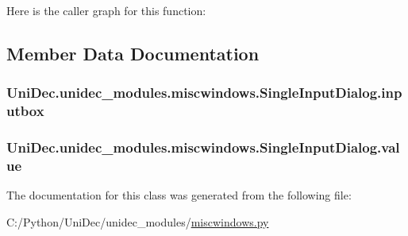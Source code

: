 Here is the caller graph for this function\+:




\subsection{Member Data Documentation}
\hypertarget{class_uni_dec_1_1unidec__modules_1_1miscwindows_1_1_single_input_dialog_a8107fecdad52394036b5a35c7a7ba18e}{}
\subsubsection[{inputbox}]{\setlength{\rightskip}{0pt plus 5cm}Uni\+Dec.\+unidec\+\_\+modules.\+miscwindows.\+Single\+Input\+Dialog.\+inputbox}\label{class_uni_dec_1_1unidec__modules_1_1miscwindows_1_1_single_input_dialog_a8107fecdad52394036b5a35c7a7ba18e}
\hypertarget{class_uni_dec_1_1unidec__modules_1_1miscwindows_1_1_single_input_dialog_ac1f7ab7d4e2275b67387e0a83d02694a}{}
\subsubsection[{value}]{\setlength{\rightskip}{0pt plus 5cm}Uni\+Dec.\+unidec\+\_\+modules.\+miscwindows.\+Single\+Input\+Dialog.\+value}\label{class_uni_dec_1_1unidec__modules_1_1miscwindows_1_1_single_input_dialog_ac1f7ab7d4e2275b67387e0a83d02694a}


The documentation for this class was generated from the following file\+:\begin{DoxyCompactItemize}
\item 
C\+:/\+Python/\+Uni\+Dec/unidec\+\_\+modules/\hyperlink{miscwindows_8py}{miscwindows.\+py}\end{DoxyCompactItemize}
